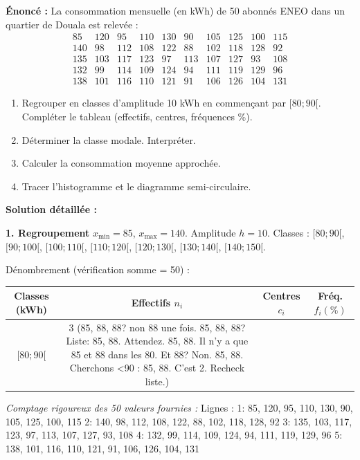 \documentclass[11pt]{article}
\begin{document}
\begin{exoresolu}
\textbf{Énoncé :} La consommation mensuelle (en kWh) de 50 abonnés ENEO dans un quartier de Douala est relevée :
\[
\begin{array}{cccccccccc}
85 & 120 & 95 & 110 & 130 & 90 & 105 & 125 & 100 & 115 \\
140 & 98 & 112 & 108 & 122 & 88 & 102 & 118 & 128 & 92 \\
135 & 103 & 117 & 123 & 97 & 113 & 107 & 127 & 93 & 108 \\
132 & 99 & 114 & 109 & 124 & 94 & 111 & 119 & 129 & 96 \\
138 & 101 & 116 & 110 & 121 & 91 & 106 & 126 & 104 & 131
\end{array}
\]
\begin{enumerate}
    \item Regrouper en classes d'amplitude 10 kWh en commençant par $[80;90[$. Compléter le tableau (effectifs, centres, fréquences \%). 
    \item Déterminer la classe modale. Interpréter.
    \item Calculer la consommation moyenne approchée.
    \item Tracer l'histogramme et le diagramme semi-circulaire.
\end{enumerate}

\textbf{Solution détaillée :}

\textbf{1. Regroupement}
$x_{\min}=85$, $x_{\max}=140$. Amplitude $h=10$. Classes : $[80;90[$, $[90;100[$, $[100;110[$, $[110;120[$, $[120;130[$, $[130;140[$, $[140;150[$.

Dénombrement (vérification somme = 50) :
\begin{center}
\begin{tabular}{|c|c|c|c|}\hline
\textbf{Classes (kWh)} & \textbf{Effectifs $n_i$} & \textbf{Centres $c_i$} & \textbf{Fréq. $f_i(\%)$} \\ \hline
$[80 ; 90[$ & 3 (85, 88, 88? non 88 une fois. 85, 88, 88? Liste: 85, 88. Attendez. 85, 88. Il n'y a que 85 et 88 dans les 80. Et 88? Non. 85, 88. Cherchons <90 : 85, 88. C'est 2. Recheck liste.) 
\end{tabular}
\end{center}
\emph{Comptage rigoureux des 50 valeurs fournies :}
Lignes :
1: 85, 120, 95, 110, 130, 90, 105, 125, 100, 115
2: 140, 98, 112, 108, 122, 88, 102, 118, 128, 92
3: 135, 103, 117, 123, 97, 113, 107, 127, 93, 108
4: 132, 99, 114, 109, 124, 94, 111, 119, 129, 96
5: 138, 101, 116, 110, 121, 91, 106, 126, 104, 131


\end{exoresolu}
\end{document}
